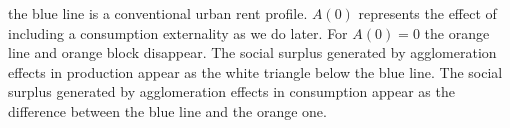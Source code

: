 the blue line is a conventional urban rent profile. $A(0)$ represents the effect of including a consumption externality as we do later.  For  $A(0)=0$ the orange line and orange block disappear. 
The social surplus generated by agglomeration effects in production appear as the white triangle below the blue line. The social surplus generated by agglomeration effects in consumption appear as the difference between the blue line and the orange one.
%

